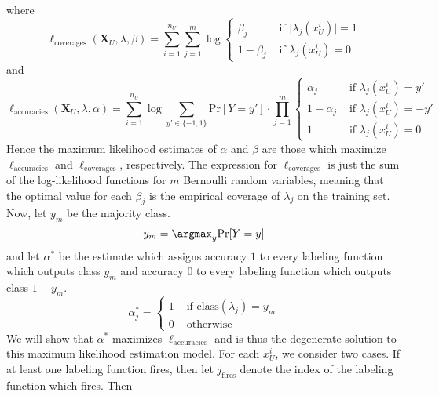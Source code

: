 where
\begin{equation*}
    \ell_\text{coverages}(\boldsymbol{X}_U,\lambda,\beta)=\sum_{i=1}^{n_U}\sum_{j=1}^m\log\begin{cases}
        \beta_j&\text{ if }\lvert\lambda_j(x^i_U)\rvert=1\\
        1-\beta_j&\text{ if }\lambda_j(x^i_U)=0
    \end{cases}
\end{equation*}
and
\begin{equation*}
    \ell_\text{accuracies}(\boldsymbol{X}_U,\lambda,\alpha)=\sum_{i=1}^{n_U}\log\sum_{y'\in\{-1,1\}}\text{Pr}[Y=y']\cdot\prod_{j=1}^m\begin{cases}
        \alpha_j&\text{ if }\lambda_j(x^i_U)=y'\\
        1-\alpha_j&\text{ if }\lambda_j(x^i_U)=-y'\\
        1&\text{ if }\lambda_j(x^i_U)=0
    \end{cases}
\end{equation*}
Hence the maximum likelihood estimates of $\alpha$ and $\beta$ are those which maximize $\ell_\text{accuracies}$ and $\ell_\text{coverages}$, respectively. The expression for $\ell_\text{coverages}$ is just the sum of the log-likelihood functions for $m$ Bernoulli random variables, meaning that the optimal value for each $\beta_j$ is the empirical coverage of $\lambda_j$ on the training set. Now, let $y_m$ be the majority class.
\begin{equation*}
    y_m=\argmax_y\text{Pr}[Y=y]
\end{equation*}
and let $\alpha^*$ be the estimate which assigns accuracy $1$ to every labeling function which outputs class $y_m$ and accuracy $0$ to every labeling function which outputs class $1-y_m$.
\begin{equation*}
    \alpha^*_j=\begin{cases}
        1&\text{ if }\text{class}(\lambda_j)=y_m\\
        0&\text{ otherwise}
    \end{cases}
\end{equation*}
We will show that $\alpha^*$ maximizes $\ell_\text{accuracies}$ and is thus the degenerate solution to this maximum likelihood estimation model. For each $x^i_U$, we consider two cases. If at least one labeling function fires, then let $j_\text{fires}$ denote the index of the labeling function which fires. Then
